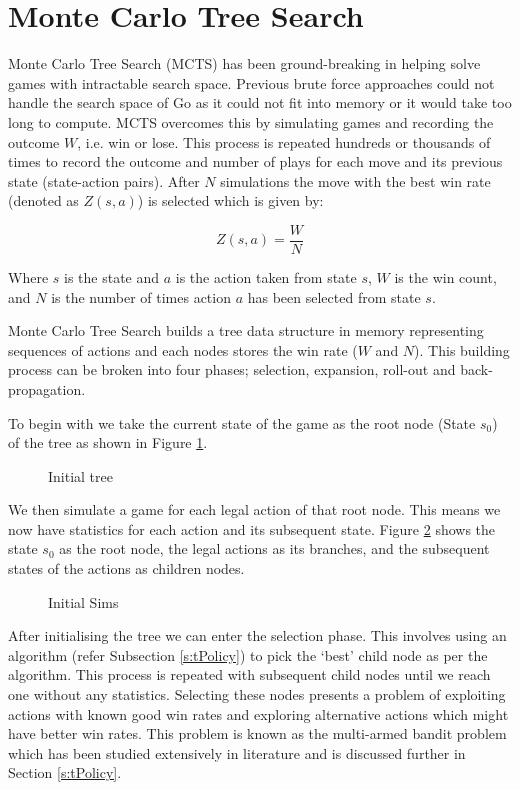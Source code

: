 \documentclass{bhamthesis}
\theoremstyle{definition}
\begin{document}
\section{Monte Carlo Tree Search}\label{s:mcts}
Monte Carlo Tree Search (MCTS) has been ground-breaking in helping solve games with intractable search space. Previous brute force approaches could not handle the search space of Go as it could not fit into memory or it would take too long to compute. MCTS overcomes this by simulating games and recording the outcome $W$, i.e. win or lose. This process is repeated hundreds or thousands of times to record the outcome and number of plays for each move and its previous state (state-action pairs). After $N$ simulations the move with the best win rate (denoted as $Z(s,a)$) is selected which is given by:

\begin{equation}\label{utility}
Z(s,a) = \frac{W}{N}
\end{equation} 

Where $s$ is the state and $a$ is the action taken from state $s$, $W$ is the win count, and $N$ is the number of times action $a$ has been selected from state $s$.

Monte Carlo Tree Search builds a tree data structure in memory representing sequences of actions and each nodes stores the win rate ($W$ and $N$). This building process can be broken into four phases; selection, expansion, roll-out and back-propagation.

To begin with we take the current state of the game as the root node (State $s_0$) of the tree as shown in Figure \ref{f:initTree}.
\begin{figure}
	
	\caption{Initial tree}\label{f:initTree}
\end{figure}
We then simulate a game for each legal action of that root node. This means we now have statistics for each action and its subsequent state. Figure \ref{f:initSim} shows the state $s_0$ as the root node, the legal actions as its branches, and the subsequent states of the actions as children nodes.
\begin{figure}
	
	\caption{Initial Sims}\label{f:initSim}
\end{figure}
After initialising the tree we can enter the selection phase. This involves using an algorithm (refer Subsection \ref{s:tPolicy}) to pick the `best' child node as per the algorithm. This process is repeated with subsequent child nodes until we reach one without any statistics. Selecting these nodes presents a problem of exploiting actions with known good win rates and exploring alternative actions which might have better win rates. This problem is known as the multi-armed bandit problem which has been studied extensively in literature and is discussed further in Section \ref{s:tPolicy}.
\end{document}
